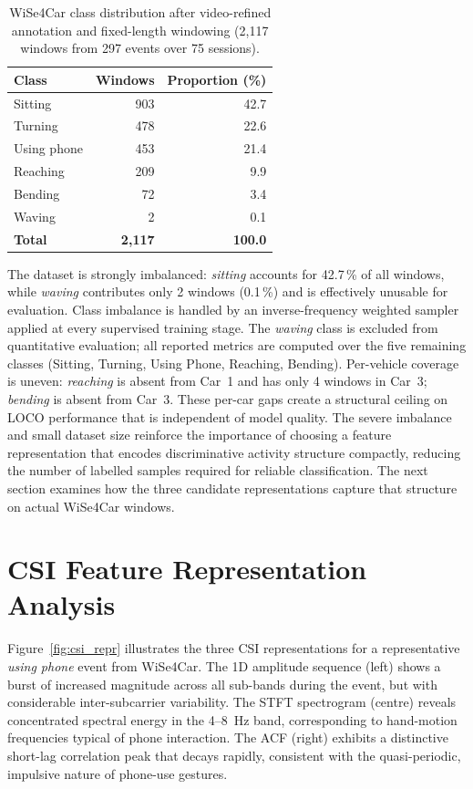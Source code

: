 \documentclass[english,bibtex]{kththesis}
\begin{document}
\begin{table}[!ht]
\caption{WiSe4Car class distribution after video-refined annotation and fixed-length windowing (2{,}117 windows from 297 events over 75 sessions).}
\label{tab:classdist_ch4}
\centering
\begin{tabular}{lrr}
\toprule
\textbf{Class} & \textbf{Windows} & \textbf{Proportion (\%)} \\
\midrule
Sitting      & 903 & 42.7 \\
Turning      & 478 & 22.6 \\
Using phone  & 453 & 21.4 \\
Reaching     & 209 &  9.9 \\
Bending      &  72 &  3.4 \\
Waving       &   2 &  0.1 \\
\midrule
\textbf{Total} & \textbf{2{,}117} & \textbf{100.0} \\
\bottomrule
\end{tabular}
\end{table}

The dataset is strongly imbalanced: \textit{sitting} accounts for 42.7\,\% of all windows, while \textit{waving} contributes only 2 windows (0.1\,\%) and is effectively unusable for evaluation. Class imbalance is handled by an inverse-frequency weighted sampler applied at every supervised training stage. The \textit{waving} class is excluded from quantitative evaluation; all reported metrics are computed over the five remaining classes (Sitting, Turning, Using Phone, Reaching, Bending). Per-vehicle coverage is uneven: \textit{reaching} is absent from Car~1 and has only 4 windows in Car~3; \textit{bending} is absent from Car~3. These per-car gaps create a structural ceiling on LOCO performance that is independent of model quality. The severe imbalance and small dataset size reinforce the importance of choosing a feature representation that encodes discriminative activity structure compactly, reducing the number of labelled samples required for reliable classification. The next section examines how the three candidate representations capture that structure on actual WiSe4Car windows.

\section{CSI Feature Representation Analysis}
\label{sec:reprresults}

Figure~\ref{fig:csi_repr} illustrates the three CSI representations for a representative \textit{using phone} event from WiSe4Car. The 1D amplitude sequence (left) shows a burst of increased magnitude across all sub-bands during the event, but with considerable inter-subcarrier variability. The STFT spectrogram (centre) reveals concentrated spectral energy in the 4--8~Hz band, corresponding to hand-motion frequencies typical of phone interaction. The ACF (right) exhibits a distinctive short-lag correlation peak that decays rapidly, consistent with the quasi-periodic, impulsive nature of phone-use gestures.
\end{document}
